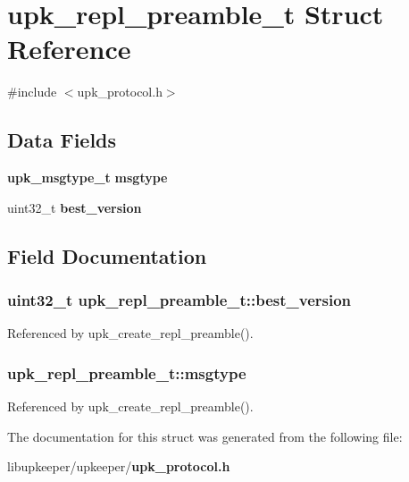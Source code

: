 \section{upk\_\-repl\_\-preamble\_\-t Struct Reference}
\label{structupk__repl__preamble__t}


{\ttfamily \#include $<$upk\_\-protocol.h$>$}

\subsection*{Data Fields}
\begin{DoxyCompactItemize}
\item 
{\bf upk\_\-msgtype\_\-t} {\bf msgtype}
\item 
uint32\_\-t {\bf best\_\-version}
\end{DoxyCompactItemize}


\subsection{Field Documentation}
\subsubsection[{best\_\-version}]{\setlength{\rightskip}{0pt plus 5cm}uint32\_\-t {\bf upk\_\-repl\_\-preamble\_\-t::best\_\-version}}\label{structupk__repl__preamble__t_acb127799abee95f15a59a0097b239658}


Referenced by upk\_\-create\_\-repl\_\-preamble().

\subsubsection[{msgtype}]{ {\bf upk\_\-repl\_\-preamble\_\-t::msgtype}}\label{structupk__repl__preamble__t_a0eaad3473178ed8d37b80a739a0db41b}


Referenced by upk\_\-create\_\-repl\_\-preamble().



The documentation for this struct was generated from the following file:\begin{DoxyCompactItemize}
\item 
libupkeeper/upkeeper/{\bf upk\_\-protocol.h}\end{DoxyCompactItemize}
